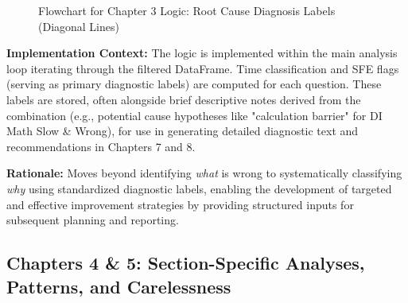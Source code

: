 \documentclass{article}
\begin{document}
\begin{figure}[htbp]
{
} %
\vspace{\baselineskip} %
\caption{Flowchart for Chapter 3 Logic: Root Cause Diagnosis Labels (Diagonal Lines)} %
\label{fig:chapter3_logic_diagonal} %
\end{figure}

\textbf{Implementation Context:} The logic is implemented within the main analysis loop iterating through the filtered DataFrame. Time classification and SFE flags (serving as primary diagnostic labels) are computed for each question. These labels are stored, often alongside brief descriptive notes derived from the combination (e.g., potential cause hypotheses like "calculation barrier" for DI Math Slow \& Wrong), for use in generating detailed diagnostic text and recommendations in Chapters 7 and 8.

\textbf{Rationale:} Moves beyond identifying \textit{what} is wrong to systematically classifying \textit{why} using standardized diagnostic labels, enabling the development of targeted and effective improvement strategies by providing structured inputs for subsequent planning and reporting.

\subsection{Chapters 4 \& 5: Section-Specific Analyses, Patterns, and Carelessness}
\end{document}
